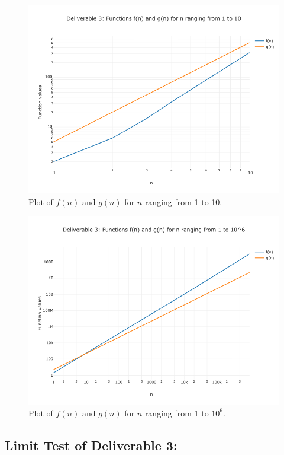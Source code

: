 \documentclass{article}
\begin{document}
\begin{figure}[H]
    \centering
    \includegraphics[width=\textwidth]{Deliverable 3: plot_1_to_10.png}
    \caption{Plot of $f(n)$ and $g(n)$ for $n$ ranging from 1 to 10.}
    \label{del3: plot_1_to_10}
\end{figure}

\begin{figure}[H]
    \centering
    \includegraphics[width=\textwidth]{Deliverable 3: plot_1_to_1000000.png}
    \caption{Plot of $f(n)$ and $g(n)$ for $n$ ranging from 1 to $10^6$.}
    \label{del3: plot_1_to10^6}
\end{figure}

\subsection{Limit Test of Deliverable 3: }
\end{document}
